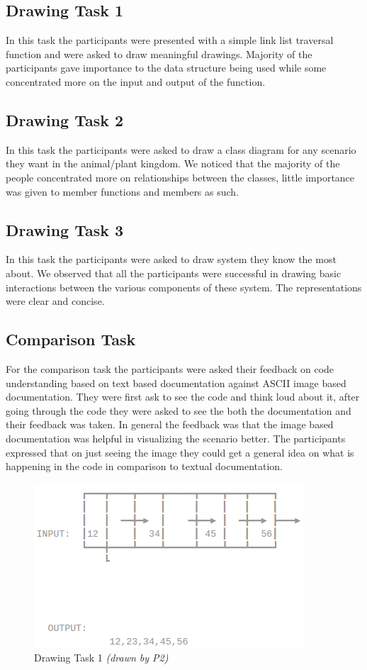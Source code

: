 \documentclass{sig-alternate}
\begin{document}
\subsection{Drawing Task 1}
In this task the participants were presented with a simple link list traversal function and were asked to draw meaningful drawings. Majority of the participants gave importance to the data structure being used while some concentrated more on the input and output of the function.

\subsection{Drawing Task 2}
In this task the participants were asked to draw a class diagram for any scenario they want in the animal/plant kingdom. We noticed that the majority of the people concentrated more on relationships between the classes, little importance was given to member functions and members as such.

\subsection{Drawing Task 3}
In this task the participants were asked to draw system they know the most about. We observed that all the participants were successful in drawing basic interactions between the various components of  these system. The representations were clear and concise.

\subsection{Comparison Task}
For the comparison task the participants were asked their feedback on code understanding based on text based documentation against ASCII image based documentation. They were first ask to see the code and think loud about it, after going through the code they were asked to see the both the documentation and their feedback was taken. In general the feedback was that the image based documentation was helpful in visualizing the scenario better. The participants expressed that on just seeing the image they could get a general idea on what is happening in the code in comparison to textual documentation. 


\begin{figure}[H]
\centering
\includegraphics[scale=.35]{drawing_task_1.png}
\caption{Drawing Task 1 \textit{(drawn by P2)}}
\label{fig:drawing_task_1}
\end{figure}
\end{document}
